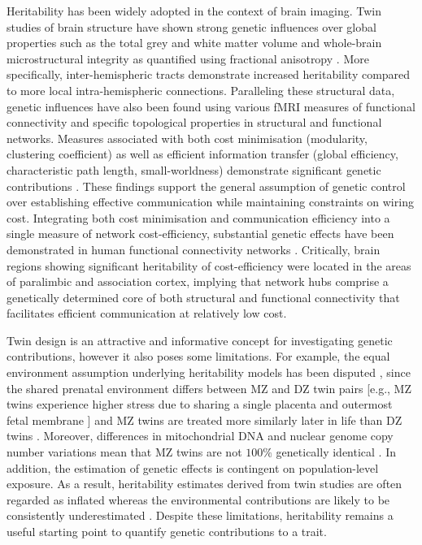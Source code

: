 Heritability has been widely adopted in the context of brain imaging. Twin studies of brain structure have shown strong genetic influences over global properties such as the total grey and white matter volume
\citep{Baare2001,Bohlken2014,Wright2002} and whole-brain microstructural integrity as quantified using fractional anisotropy \citep{Bohlken2014}. More specifically, inter-hemispheric tracts demonstrate increased heritability \citep{Shen2014,Sudre2017} compared to more local intra-hemispheric connections. Paralleling these structural data, genetic influences have also been found using various fMRI measures of functional connectivity \citep{Colclough2017,Fu2015,Glahn2010,Sudre2017} and specific topological properties in structural \citep{Bohlken2014} and functional \citep{Fornito2011,Sinclair2015}  networks. Measures associated with both cost minimisation (modularity, clustering coefficient) as well as efficient information transfer (global efficiency, characteristic path length, small-worldness) demonstrate significant genetic contributions \citep{Sinclair2015,Bohlken2014}. These findings support the general assumption of genetic control over establishing effective communication while maintaining constraints on wiring cost. Integrating both cost minimisation and communication efficiency into a single measure of network cost-efficiency, substantial genetic effects have been demonstrated in human functional connectivity networks \citep{Fornito2011}. Critically, brain regions showing significant heritability of cost-efficiency were located in the areas of paralimbic and association cortex, implying that network hubs comprise a genetically determined core of both structural and functional connectivity that facilitates efficient communication at relatively low cost.

Twin design is an attractive and informative concept for investigating genetic contributions, however it also poses some limitations. For example, the equal environment assumption underlying heritability models has been disputed  \citep{Charney2017,Joseph2002}, since the shared prenatal environment differs between MZ and DZ twin pairs [e.g., MZ twins experience higher stress due to sharing a single placenta and outermost fetal membrane \citep{Corsello2010}] and MZ twins are treated more similarly later in life than DZ twins \citep{Joseph2002}. Moreover, differences in mitochondrial DNA and nuclear genome copy number variations mean that MZ twins are not $100\%$ genetically identical \citep{Bruder2008,Charney2017}. In addition, the estimation of genetic effects is contingent on population-level exposure. As a result, heritability estimates derived from twin studies are often regarded as inflated whereas the environmental contributions are likely to be consistently underestimated \citep{Joseph2002}. Despite these limitations, heritability remains a useful starting point to quantify genetic contributions to a trait.

